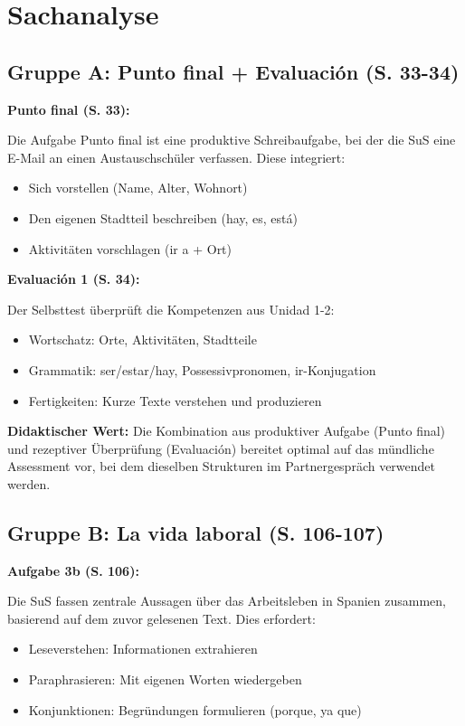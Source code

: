 \documentclass[11pt, a4paper]{article}
\begin{document}
\section{Sachanalyse}

\subsection{Gruppe A: Punto final + Evaluación (S. 33-34)}

\textbf{Punto final (S. 33):}

Die Aufgabe \glqq{}Punto final\grqq{} ist eine produktive Schreibaufgabe, bei der die SuS eine E-Mail an einen Austauschschüler verfassen. Diese integriert:
\begin{itemize}[leftmargin=2em]
    \item Sich vorstellen (Name, Alter, Wohnort)
    \item Den eigenen Stadtteil beschreiben (hay, es, está)
    \item Aktivitäten vorschlagen (ir a + Ort)
\end{itemize}

\textbf{Evaluación 1 (S. 34):}

Der Selbsttest überprüft die Kompetenzen aus Unidad 1-2:
\begin{itemize}[leftmargin=2em]
    \item Wortschatz: Orte, Aktivitäten, Stadtteile
    \item Grammatik: ser/estar/hay, Possessivpronomen, ir-Konjugation
    \item Fertigkeiten: Kurze Texte verstehen und produzieren
\end{itemize}

\textbf{Didaktischer Wert:}
Die Kombination aus produktiver Aufgabe (Punto final) und rezeptiver Überprüfung (Evaluación) bereitet optimal auf das mündliche Assessment vor, bei dem dieselben Strukturen im Partnergespräch verwendet werden.

\subsection{Gruppe B: La vida laboral (S. 106-107)}

\textbf{Aufgabe 3b (S. 106):}

Die SuS fassen zentrale Aussagen über das Arbeitsleben in Spanien zusammen, basierend auf dem zuvor gelesenen Text. Dies erfordert:
\begin{itemize}[leftmargin=2em]
    \item Leseverstehen: Informationen extrahieren
    \item Paraphrasieren: Mit eigenen Worten wiedergeben
    \item Konjunktionen: Begründungen formulieren (porque, ya que)
\end{itemize}
\end{document}
